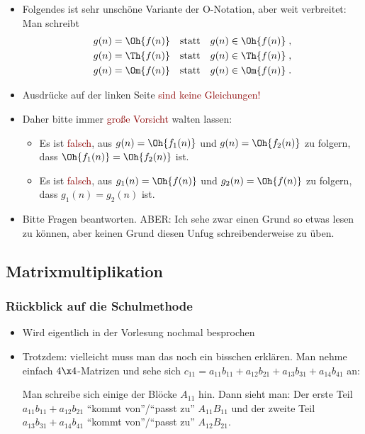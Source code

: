 \documentclass[12pt]{article}
\theoremstyle{margin}
\theoremstyle{margin}
\def\Red#1{\textcolor{darkred}{#1}}
\begin{document}
  \begin{itemize}
  \item Folgendes ist sehr unsch\"one Variante der O-Notation, aber weit verbreitet: \\
  Man schreibt
    \begin{align*}
      g(n) = \Oh{f(n)}  &\text{\quad statt\quad }  g(n) \in \Oh{f(n)} \;, \\
      g(n) = \Th{f(n)}  &\text{\quad statt\quad }  g(n) \in \Th{f(n)} \;, \\
      g(n) = \Om{f(n)}  &\text{\quad statt\quad }  g(n) \in \Om{f(n)} \;.
    \end{align*}
  \item Ausdr\"ucke auf der linken Seite \Red{sind keine Gleichungen!}
  \item Daher bitte immer \Red{gro\ss e Vorsicht} walten lassen:
    \begin{itemize}
    \item Es ist \Red{falsch}, aus $g(n)=\Oh{f_1(n)}$ und
      $g(n)=\Oh{f_2(n)}$ zu folgern, dass $\Oh{f_1(n)}=\Oh{f_2(n)}$ ist.
    \item Es ist \Red{falsch}, aus $g_1(n)=\Oh{f(n)}$ und
      $g_2(n)=\Oh{f(n)}$ zu folgern, dass $g_1(n)=g_2(n)$ ist.
    \end{itemize}
  \item Bitte Fragen beantworten. ABER: Ich sehe zwar einen Grund so etwas
  lesen zu k\"onnen, aber keinen Grund diesen Unfug schreibenderweise zu
  \"uben.
  \end{itemize}

\subsection{Matrixmultiplikation}
\subsubsection{R\"uckblick auf die Schulmethode}


  \begin{itemize}
  \item Wird eigentlich in der Vorlesung nochmal besprochen
  \item Trotzdem: vielleicht muss man das noch ein bisschen
    erkl\"aren. Man nehme einfach $4\x 4$-Matrizen und sehe sich \zB
    $c_{11}=a_{11}b_{11} + a_{12}b_{21} + a_{13}b_{31} +
    a_{14}b_{41}$ an:

    Man schreibe sich einige der Bl\"ocke $A_{11}$ \usw hin. Dann sieht
    man: Der erste Teil $a_{11}b_{11} + a_{12}b_{21}$ "`kommt
    von"'/"`passt zu"' $A_{11}B_{11}$ und der zweite Teil
    $a_{13}b_{31} + a_{14}b_{41}$ "`kommt von"'/"`passt zu"'
    $A_{12}B_{21}$.
  \end{itemize}
\end{document}
